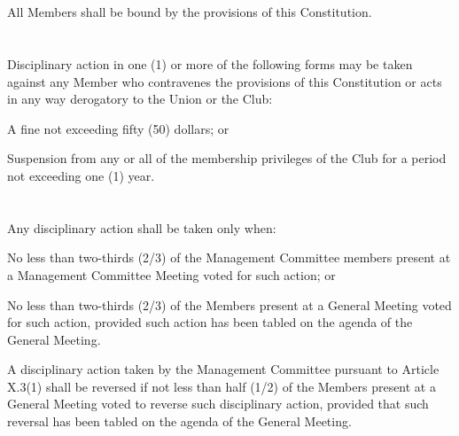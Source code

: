 
\section{}
All Members shall be bound by the provisions of this Constitution.

\section{}
Disciplinary action in one (1) or more of the following forms may be taken against any Member who contravenes the provisions of this Constitution or acts in any way derogatory to the Union or the Club:
	\begin{legal}
	\item A fine not exceeding fifty (50) dollars; or
	\item Suspension from any or all of the membership privileges of the Club for a period not exceeding one (1) year.
	\end{legal}

\section{}
Any disciplinary action shall be taken only when:
	\begin{legal}
	\item No less than two-thirds (2/3) of the Management Committee members present at a Management Committee Meeting voted for such action; or
	\item No less than two-thirds (2/3) of the Members present at a General Meeting voted for such action, provided such action has been tabled on the agenda of the General Meeting.
	\item A disciplinary action taken by the Management Committee pursuant to Article X.3(1) shall be reversed if not less than half (1/2) of the Members present at a General Meeting voted to reverse such disciplinary action, provided that such reversal has been tabled on the agenda of the General Meeting.
	\end{legal}